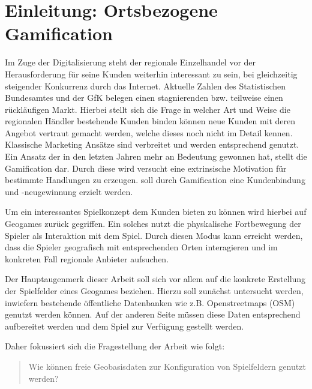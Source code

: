 \chapter{Einleitung: Ortsbezogene Gamification}
\label{ch1:Einleitung}

Im Zuge der Digitalisierung steht der regionale Einzelhandel vor der Herausforderung für seine Kunden weiterhin interessant zu sein, bei gleichzeitig steigender Konkurrenz durch das Internet. Aktuelle Zahlen des Statistischen Bundesamtes \citep{DWN.2012} und der GfK belegen einen stagnierenden bzw. teilweise einen rückläufigen Markt.
Hierbei stellt sich die Frage in welcher Art und Weise die regionalen Händler bestehende Kunden binden können neue Kunden mit deren Angebot vertraut gemacht werden, welche dieses noch nicht im Detail kennen.
Klassische Marketing Ansätze sind verbreitet und werden entsprechend genutzt.
Ein Ansatz der in den letzten Jahren mehr an Bedeutung gewonnen hat, stellt die Gamification dar. Durch diese wird versucht eine extrinsische Motivation für bestimmte Handlungen zu erzeugen. soll durch Gamification eine Kundenbindung und -neugewinnung erzielt werden.

Um ein interessantes Spielkonzept dem Kunden bieten zu können wird hierbei auf Geogames zurück gegriffen.
Ein solches nutzt die physkalische Fortbewegung der Spieler als Interaktion mit dem Spiel.
Durch diesen Modus kann erreicht werden, dass die Spieler geografisch mit entsprechenden Orten interagieren und im konkreten Fall regionale Anbieter aufsuchen.

Der Hauptaugenmerk dieser Arbeit soll sich vor allem auf die konkrete Erstellung der Spielfelder eines Geogames beziehen. Hierzu soll zunächst untersucht werden, inwiefern bestehende öffentliche Datenbanken wie z.B. Openstreetmaps (OSM) genutzt werden können. Auf der anderen Seite müssen diese Daten entsprechend aufbereitet werden und dem Spiel zur Verfügung gestellt werden.

Daher fokussiert sich die Fragestellung der Arbeit wie folgt:
\begin{quote}
\item Wie können freie Geobasisdaten zur Konfiguration von Spielfeldern genutzt werden?
\end{quote}


